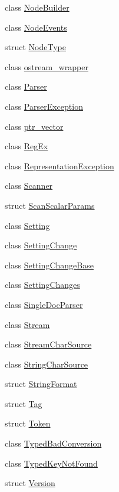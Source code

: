 \begin{DoxyCompactItemize}
\item 
class \mbox{\hyperlink{class_y_a_m_l_1_1_node_builder}{Node\+Builder}}
\item 
class \mbox{\hyperlink{class_y_a_m_l_1_1_node_events}{Node\+Events}}
\item 
struct \mbox{\hyperlink{struct_y_a_m_l_1_1_node_type}{Node\+Type}}
\item 
class \mbox{\hyperlink{class_y_a_m_l_1_1ostream__wrapper}{ostream\+\_\+wrapper}}
\item 
class \mbox{\hyperlink{class_y_a_m_l_1_1_parser}{Parser}}
\item 
class \mbox{\hyperlink{class_y_a_m_l_1_1_parser_exception}{Parser\+Exception}}
\item 
class \mbox{\hyperlink{class_y_a_m_l_1_1ptr__vector}{ptr\+\_\+vector}}
\item 
class \mbox{\hyperlink{class_y_a_m_l_1_1_reg_ex}{Reg\+Ex}}
\item 
class \mbox{\hyperlink{class_y_a_m_l_1_1_representation_exception}{Representation\+Exception}}
\item 
class \mbox{\hyperlink{class_y_a_m_l_1_1_scanner}{Scanner}}
\item 
struct \mbox{\hyperlink{struct_y_a_m_l_1_1_scan_scalar_params}{Scan\+Scalar\+Params}}
\item 
class \mbox{\hyperlink{class_y_a_m_l_1_1_setting}{Setting}}
\item 
class \mbox{\hyperlink{class_y_a_m_l_1_1_setting_change}{Setting\+Change}}
\item 
class \mbox{\hyperlink{class_y_a_m_l_1_1_setting_change_base}{Setting\+Change\+Base}}
\item 
class \mbox{\hyperlink{class_y_a_m_l_1_1_setting_changes}{Setting\+Changes}}
\item 
class \mbox{\hyperlink{class_y_a_m_l_1_1_single_doc_parser}{Single\+Doc\+Parser}}
\item 
class \mbox{\hyperlink{class_y_a_m_l_1_1_stream}{Stream}}
\item 
class \mbox{\hyperlink{class_y_a_m_l_1_1_stream_char_source}{Stream\+Char\+Source}}
\item 
class \mbox{\hyperlink{class_y_a_m_l_1_1_string_char_source}{String\+Char\+Source}}
\item 
struct \mbox{\hyperlink{struct_y_a_m_l_1_1_string_format}{String\+Format}}
\item 
struct \mbox{\hyperlink{struct_y_a_m_l_1_1_tag}{Tag}}
\item 
struct \mbox{\hyperlink{struct_y_a_m_l_1_1_token}{Token}}
\item 
class \mbox{\hyperlink{class_y_a_m_l_1_1_typed_bad_conversion}{Typed\+Bad\+Conversion}}
\item 
class \mbox{\hyperlink{class_y_a_m_l_1_1_typed_key_not_found}{Typed\+Key\+Not\+Found}}
\item 
struct \mbox{\hyperlink{struct_y_a_m_l_1_1_version}{Version}}
\end{DoxyCompactItemize}
